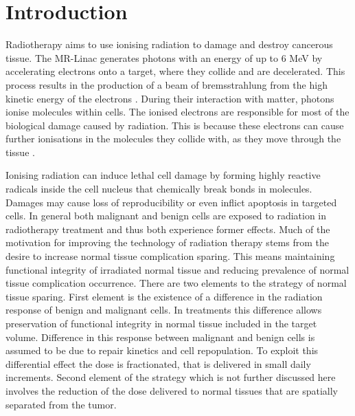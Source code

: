 \documentclass[\relativeRoot/ada.tex]{subfiles}
\begin{document}
\twocolumn


\section{Introduction}

Radiotherapy aims to use ionising radiation to damage and destroy cancerous tissue. The MR-Linac generates photons with an energy of up to $6$ MeV by accelerating electrons onto a target, where they collide and are decelerated. This process results in the production of a beam of bremsstrahlung from the high kinetic energy of the electrons \cite{klueter_technical}. During their interaction with matter, photons ionise molecules within cells. The ionised electrons are responsible for most of the biological damage caused by radiation. This is because these electrons can cause further ionisations in the molecules they collide with, as they move through the tissue \cite{barrett_practical}.

Ionising radiation can induce lethal cell damage by forming highly reactive radicals inside the cell nucleus that chemically break bonds in molecules. Damages may cause loss of reproducibility or even inflict apoptosis in targeted cells. In general both malignant and benign cells are exposed to radiation in radiotherapy treatment and thus both experience former effects. Much of the motivation for improving the technology of radiation therapy stems from the desire to increase normal tissue complication sparing. This means maintaining functional integrity of irradiated normal tissue and reducing prevalence of normal tissue complication occurrence. There are two elements to the strategy of normal tissue sparing. First element is the existence of a difference in the radiation response of benign and malignant cells. In treatments this difference allows preservation of functional integrity in normal tissue included in the target volume. Difference in this response between malignant and benign cells is assumed to be due to repair kinetics and cell repopulation. To exploit this differential effect the dose is fractionated, that is delivered in small daily increments. Second element of the strategy which is not further discussed here involves the reduction of the dose delivered to normal tissues that are spatially separated from the tumor. \cite{goitein_oncology}
\end{document}
